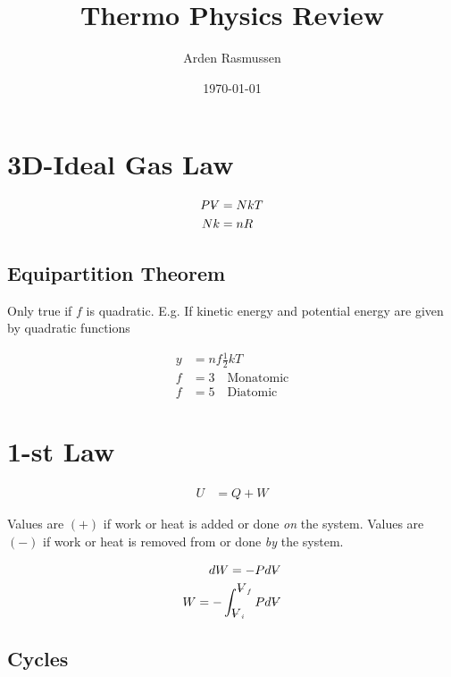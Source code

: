 \documentclass[10pt]{article}
\title{Thermo Physics Review}
\date{\today}
\author{Arden Rasmussen}
\newcommand{\V}{{\ooalign{\hfil$V$\hfil\cr\kern0.08em--\hfil\cr}}}
\begin{document}
\maketitle
\newpage
\tableofcontents
\newpage
{}

\section{3D-Ideal Gas Law}%
\label{sec:3d_ideal_gas_law}

\begin{align}
  P\V&=NkT\\
  Nk&=nR
\end{align}

\subsection{Equipartition Theorem}%
\label{sub:equipartition_theorem}

Only true if $f$ is quadratic. E.g. If kinetic energy and potential energy are
given by quadratic functions

\begin{align}
  y&=nf\frac{1}{2}kT\\
  f&=3\quad\text{Monatomic}\\
  f&=5\quad\text{Diatomic}
\end{align}

\section{1-st Law}%
\label{sec:1_st_law}

\begin{align}
  U&=Q+W
\end{align}

Values are $(+)$ if work or heat is added or done \textit{on}  the system.
Values are $(-)$ if work or heat is removed from or done \textit{by}  the
system.

\begin{align}
  dW=-Pd\V\\
  W=-\int_{\V_i}^{\V_f}Pd\V
\end{align}

\subsection{Cycles}%
\label{sub:cycles}
\end{document}
